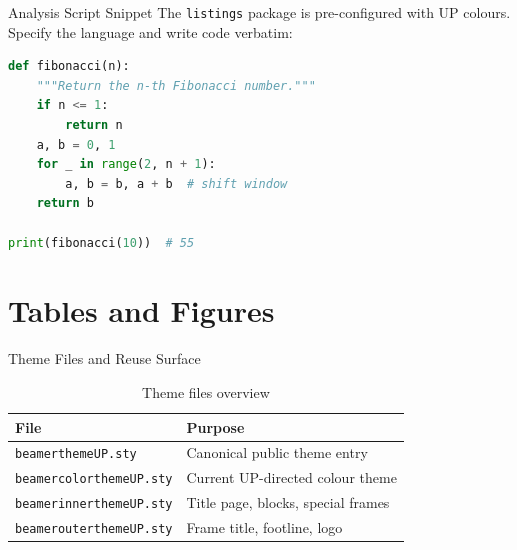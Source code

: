 \documentclass[aspectratio=169]{beamer}
\begin{document}
\begin{frame}[fragile]{Analysis Script Snippet}
The \texttt{listings} package is pre-configured with UP colours.
  Specify the language and write code verbatim:

  \begin{lstlisting}[language=Python]
def fibonacci(n):
    """Return the n-th Fibonacci number."""
    if n <= 1:
        return n
    a, b = 0, 1
    for _ in range(2, n + 1):
        a, b = b, a + b  # shift window
    return b

print(fibonacci(10))  # 55
  \end{lstlisting}
\end{frame}

\section{Tables and Figures}

\begin{frame}{Theme Files and Reuse Surface}
  \begin{table}
    \centering
    \caption{Theme files overview}
    \begin{tabular}{ll}
      \hline
      \textbf{File} & \textbf{Purpose} \\
      \hline
      \texttt{beamerthemeUP.sty}       & Canonical public theme entry \\
      \texttt{beamercolorthemeUP.sty}  & Current UP-directed colour theme \\
      \texttt{beamerinnerthemeUP.sty}  & Title page, blocks, special frames \\
      \texttt{beamerouterthemeUP.sty}  & Frame title, footline, logo \\
      \hline
    \end{tabular}
  \end{table}
\end{frame}
\end{document}
